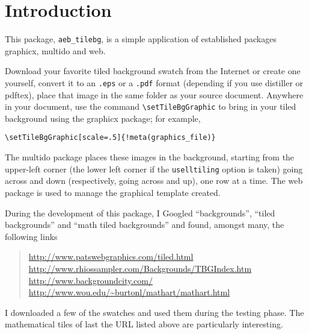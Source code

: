 \documentclass{article}
\let\pkg\textsf
\let\amtIndent\leftmargini
\begin{document}
\maketitle

\tableofcontents
{}




\section{Introduction}

This package, \texttt{aeb\_tilebg}, is a simple application
of established packages \textsf{graphicx}, \textsf{multido} and
\pkg{web}.

Download your favorite tiled background swatch from the Internet or create one yourself,
convert it to an \texttt{.eps} or a \texttt{.pdf} format (depending
if you use \textsf{distiller} or \textsf{pdftex}), place that image
in the same folder as your source document. Anywhere in your
document, use the command \verb!\setTileBgGraphic! to bring in your
tiled background using the \textsf{graphicx} package; for example,
\begin{Verbatim}[xleftmargin=\amtIndent,fontsize=\small,commandchars=!()]
\setTileBgGraphic[scale=.5]{!meta(graphics_file)}
\end{Verbatim}
The \textsf{multido} package places these images in the background,
starting from the upper-left corner (the lower left corner if the
\texttt{uselltiling} option is taken) going across and down
(respectively, going across and up), one row at a time. The \pkg{web}
package is used to manage the graphical template created.

During the development of this package, I Googled ``backgrounds'',
``tiled backgrounds'' and ``math tiled backgrounds'' and found,
amongst many, the following links
\begin{quote}
\url{http://www.patswebgraphics.com/tiled.html}\\
\url{http://www.rhiossampler.com/Backgrounds/TBGIndex.htm}\\
\url{http://www.backgroundcity.com/}\\
\url{http://www.wou.edu/~burtonl/mathart/mathart.html}
\end{quote}
I downloaded a few of the swatches and used them during the testing
phase. The mathematical tiles of last the URL listed above are
particularly interesting.
\end{document}
